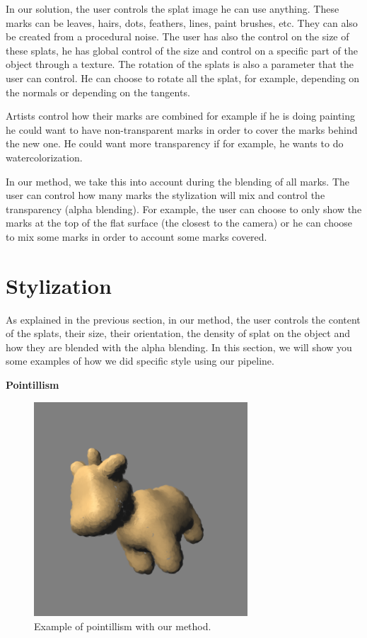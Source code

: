 In our solution, the user controls the splat image he can use anything. These marks can be leaves, hairs, dots, feathers, lines, paint brushes, etc. They can also be created from a procedural noise. The user has also the control on the size of these splats, he has global control of the size and control on a specific part of the object through a texture. The rotation of the splats is also a parameter that the user can control. He can choose to rotate all the splat, for example, depending on the normals or depending on the tangents. \newline

Artists control how their marks are combined for example if he is doing painting he could want to have non-transparent marks in order to cover the marks behind the new one. He could want more transparency if for example, he wants to do watercolorization.\newline

In our method, we take this into account during the blending of all marks. The user can control how many marks the stylization will mix and control the transparency (alpha blending). For example, the user can choose to only show the marks at the top of the flat surface (the closest to the camera) or he can choose to mix some marks in order to account some marks covered.


\section{Stylization}

As explained in the previous section, in our method, the user controls the content of the splats, their size, their orientation, the density of splat on the object and how they are blended with the alpha blending. In this section, we will show you some examples of how we did specific style using our pipeline. \newline

\textbf{Pointillism}

\begin{figure}[H]
    \begin{center}
    \includegraphics[width=80mm, height=80mm]{Resultats/spotPoint/final.png}
    \end{center}
    \caption{Example of pointillism with our method.}
    \label{final_point}
\end{figure}

